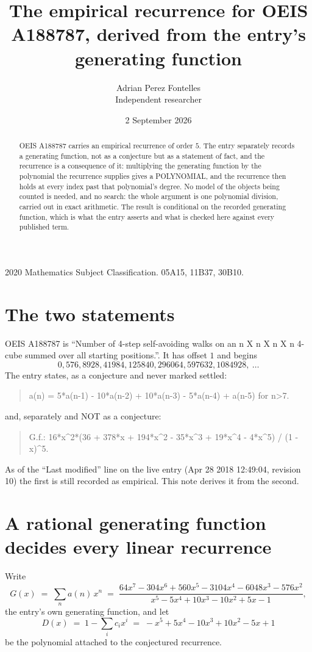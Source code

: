 \documentclass[11pt,a4paper]{article}
\title{The empirical recurrence for OEIS A188787, derived from the entry's generating function}
\author{Adrian Perez Fontelles\\ \small Independent researcher}
\date{2 September 2026}
\theoremstyle{plain}
\theoremstyle{definition}
\begin{document}
\maketitle

\begin{abstract}
OEIS A188787 carries an empirical recurrence of order $5$. The entry separately records a
generating function, not as a conjecture but as a statement of fact, and the recurrence is a
consequence of it: multiplying the generating function by the polynomial the recurrence
supplies gives a POLYNOMIAL, and the recurrence then holds at every index past that
polynomial's degree. No model of the objects being counted is needed, and no search: the
whole argument is one polynomial division, carried out in exact arithmetic. The result is
conditional on the recorded generating function, which is what the entry asserts and what is
checked here against every published term.
\end{abstract}

\noindent\small 2020 Mathematics Subject Classification. 05A15, 11B37, 30B10.\normalsize

\section{The two statements}

OEIS A188787 is ``Number of 4-step self-avoiding walks on an n X n X n X n 4-cube summed over all starting positions.''. It has offset $1$ and begins
\[
0, 576, 8928, 41984, 125840, 296064, 597632, 1084928,\ \dots
\]
The entry states, as a conjecture and never marked settled:
\begin{quote}
a(n) = 5*a(n-1) - 10*a(n-2) + 10*a(n-3) - 5*a(n-4) + a(n-5) for n>7.
\end{quote}
and, separately and NOT as a conjecture:
\begin{quote}
G.f.: 16*x\^{}2*(36 + 378*x + 194*x\^{}2 - 35*x\^{}3 + 19*x\^{}4 - 4*x\^{}5) / (1 - x)\^{}5.
\end{quote}
As of the ``Last modified'' line on the live entry (Apr 28 2018 12:49:04, revision 10) the first is still
recorded as empirical. This note derives it from the second.

\section{A rational generating function decides every linear recurrence}

Write
\[
G(x)\;=\;\sum_{n}a(n)\,x^{n}\;=\;\frac{64 x^{7} - 304 x^{6} + 560 x^{5} - 3104 x^{4} - 6048 x^{3} - 576 x^{2}}{x^{5} - 5 x^{4} + 10 x^{3} - 10 x^{2} + 5 x - 1},
\]
the entry's own generating function, and let
\[
D(x)\;=\;1-\sum_i c_i x^{i}\;=\;- x^{5} + 5 x^{4} - 10 x^{3} + 10 x^{2} - 5 x + 1
\]
be the polynomial attached to the conjectured recurrence.
\end{document}
